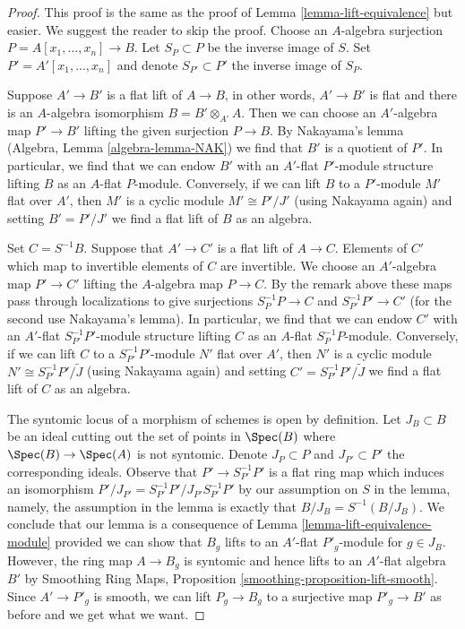 \begin{proof}
This proof is the same as the proof of
Lemma \ref{lemma-lift-equivalence} but easier. We suggest the
reader to skip the proof.
Choose an $A$-algebra surjection $P = A[x_1, \ldots, x_n] \to B$.
Let $S_P \subset P$ be the inverse image of $S$.
Set $P' = A'[x_1, \ldots, x_n]$ and denote $S_{P'} \subset P'$
the inverse image of $S_P$.

\medskip\noindent
Suppose $A' \to B'$ is a flat lift of $A \to B$, in other words,
$A' \to B'$ is flat and there is an $A$-algebra isomorphism
$B = B' \otimes_{A'} A$. Then we can choose an $A'$-algebra map
$P' \to B'$ lifting the given surjection $P \to B$.
By Nakayama's lemma (Algebra, Lemma \ref{algebra-lemma-NAK})
we find that $B'$ is a quotient of $P'$. In particular, we find
that we can endow $B'$ with an $A'$-flat $P'$-module structure
lifting $B$ as an $A$-flat $P$-module.
Conversely, if we can lift $B$ to a $P'$-module $M'$ flat over $A'$,
then $M'$ is a cyclic module $M' \cong P'/J'$ (using Nakayama again)
and setting $B' = P'/J'$ we find a flat lift of $B$ as an algebra.

\medskip\noindent
Set $C = S^{-1}B$. Suppose that $A' \to C'$ is a flat lift of $A \to C$.
Elements of $C'$ which map to invertible elements of $C$ are invertible.
We choose an $A'$-algebra map $P' \to C'$ lifting
the $A$-algebra map $P \to C$. By the remark above
these maps pass through localizations to give surjections
$S_P^{-1}P \to C$ and $S_{P'}^{-1}P' \to C'$
(for the second use Nakayama's lemma).
In particular, we find that we can endow $C'$ with an $A'$-flat
$S_{P'}^{-1}P'$-module structure lifting $C$ as an $A$-flat
$S_P^{-1}P$-module. Conversely, if we can lift $C$ to a
$S_{P'}^{-1}P'$-module $N'$ flat over $A'$, then $N'$
is a cyclic module $N' \cong S_{P'}^{-1}P'/\tilde J$
(using Nakayama again) and setting $C' = S_{P'}^{-1}P'/\tilde J$
we find a flat lift of $C$ as an algebra.

\medskip\noindent
The syntomic locus of a morphism of schemes is open by definition.
Let $J_B \subset B$ be an ideal cutting out the set of points
in $\Spec(B)$ where $\Spec(B) \to \Spec(A)$ is not syntomic.
Denote $J_P \subset P$ and $J_{P'} \subset P'$ the corresponding
ideals. Observe that $P' \to S_{P'}^{-1}P'$ is a flat ring map which
induces an isomorphism $P'/J_{P'} = S_{P'}^{-1}P'/J_{P'}S_{P'}^{-1}P'$
by our assumption on $S$ in the lemma, namely, the assumption
in the lemma is exactly that $B/J_B = S^{-1}(B/J_B)$.
We conclude that our lemma is a consequence of
Lemma \ref{lemma-lift-equivalence-module} provided we can
show that $B_g$ lifts to an $A'$-flat $P'_g$-module for
$g \in J_B$. However, the ring map $A \to B_g$ is syntomic
and hence lifts to an $A'$-flat algebra $B'$ by
Smoothing Ring Maps, Proposition \ref{smoothing-proposition-lift-smooth}.
Since $A' \to P'_g$ is smooth, we can lift $P_g \to B_g$
to a surjective map $P'_g \to B'$ as before and we get what we want.
\end{proof}

